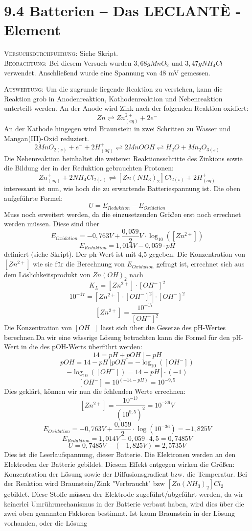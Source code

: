 \documentclass[11pt, a4paper]{article}
\begin{document}
\newpage
\section{9.4 Batterien -- Das \textsc{LECLANT\`E} - Element}


\textsc{Versuchsdurchführung:} Siehe Skript.\\

\textsc{Beobachtung:}\hspace{5mm} Bei diesem Versuch wurden $3,68g MnO_2$ und $3,47g NH_4Cl$ verwendet. Anschließend wurde eine Spannung von 48 mV gemessen. 

\textsc{Auswertung:}\hspace{8mm} Um die zugrunde liegende Reaktion zu verstehen, kann die Reaktion grob in Anodenreaktion, Kathodenreaktion und Nebenreaktion unterteilt werden. An der Anode wird Zink nach der folgenden Reaktion oxidiert: $$Zn \rightleftharpoons Zn^{2+}_{(aq)} + 2e^-$$ An der Kathode hingegen wird Braunstein in zwei Schritten zu Wasser und Mangan(III)-Oxid reduziert. $$2MnO_{2(s)} + e^- + 2 H^+_{(aq)} \rightleftharpoons 2MnOOH \rightleftharpoons H_2O + Mn_2O_{3(s)} $$ Die Nebenreaktion beinhaltet die weiteren Reaktionsschritte des Zinkions sowie die Bildung der in der Reduktion gebrauchten Protonen: $$Zn^+_{(aq)} + 2 NH_4Cl_{2(s)} \rightleftharpoons [Zn(NH_3)_2]Cl_{2(s)} + 2H^+_{(aq)}$$ interessant ist nun, wie hoch die zu erwartende Batteriespannung ist. Die oben aufgeführte Formel: $$U= E_{Reduktion} - E_{Oxidation}$$ Muss noch erweitert werden, da die einzusetzenden Größen erst noch errechnet werden müssen. Diese sind über $$E_{Oxidation} = -0,763V+\frac{0,059}{2}V\cdot\log_{10}([Zn^{2+}])$$ $$E_{Reduktion} = 1,014V - 0,059\cdot pH$$ definiert (siehe Skript). Der ph-Wert ist mit 4,5 gegeben. Die Konzentration von $[Zn^{2+}]$ wie sie für die Berechnung von $E_{Oxidation}$ gefragt ist, errechnet sich aus dem Löslichkeitsprodukt von $Zn(OH)_2$ nach $$K_L=[Zn^{2+}]\cdot [OH^-]^2$$$$\left.10^{-17}=[Zn^{2+}]\cdot [OH^-]^2\right|\cdot [OH^-]^2$$$$[Zn^{2+}] = \frac{10^{-17}}{[OH^-]^2}$$ Die Konzentration von $[OH^-]$ lässt sich über die Gesetze des pH-Wertes berechnen.Da wir eine wässrige Lösung betrachten kann die Formel für den pH-Wert in die des pOH-Werts überführt werden: $$ \left. 14=pH+pOH\ \right| -pH $$ $$ \left. pOH=14-pH\ \right| pOH=-\log_{10}([OH^-]) $$ $$ \left. -\log_{10}([OH^-])= 14-pH\ \right|\cdot (-1) $$ $$ [OH^-] = 10^{(-14-pH)} = 10^{-9,5}$$ Dies geklärt, können wir nun die fehlenden Werte errechnen: $$[Zn^{2+}]=\frac{10^{-17}}{(10^{9,5})^2}=10^{-36}V$$ $$E_{Oxidation}=-0,763V+\frac{0,059}{2}\cdot\log(10^{-36})=-1,825V$$ $$ E_{Reduktion}= 1,014V-0,059\cdot 4,5=0,7485V$$ $$U=0,7485V-(-1,825V)=2,5735V$$ Dies ist die Leerlaufspannung, dieser Batterie. Die Elektronen werden an den Elektroden der Batterie gebildet. Diesem Effekt entgegen wirken die Größen: Konzentration der Lösung sowie der Diffusionsgradient bzw. die Temperatur. Bei der Reaktion wird Braunstein/Zink "Verbraucht" bzw $[Zn(NH_3)_2]Cl_2$ gebildet. Diese Stoffe müssen der Elektrode zugeführt/abgeführt werden, da wir keinerlei Umrührmechanismus in der Batterie verbaut haben, wird dies über die zwei oben genannten Faktoren bestimmt. Ist kaum Braunstein in der Lösung vorhanden, oder die Lösung 
\end{document}
